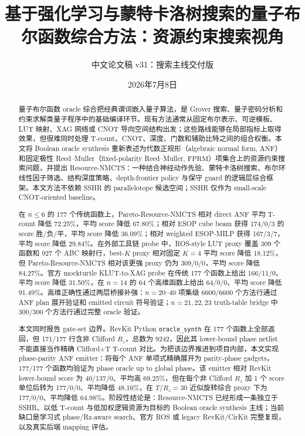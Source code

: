 \documentclass[UTF8,fontset=macnew,11pt]{ctexart}
\title{基于强化学习与蒙特卡洛树搜索的量子布尔函数综合方法：资源约束搜索视角}
\author{中文论文稿 v31：搜索主线交付版}
\date{2026年7月8日}
\newcommand{\method}{Resource-NMCTS}
\newcommand{\anf}{\ensuremath{\mathrm{ANF}}}
\newcommand{\fprm}{\ensuremath{\mathrm{FPRM}}}
\newcommand{\rz}{\ensuremath{R_z}}
\begin{document}
\pagestyle{plain}
\maketitle

\begin{abstract}
量子布尔函数 oracle 综合把经典谓词嵌入量子算法，是 Grover 搜索、量子密码分析和约束求解类量子程序中的基础编译环节。现有方法通常从固定布尔表示、可逆模板、LUT 映射、XAG 网络或 CNOT 导向空间结构出发；这些路线能够在局部指标上取得效果，但很难同时处理 T-count、CNOT、深度、门数和辅助比特之间的组合权衡。本文将 Boolean oracle synthesis 重新表述为代数正规形（algebraic normal form, \anf{}）和固定极性 Reed--Muller（fixed-polarity Reed--Muller, \fprm{}）项集合上的资源约束搜索问题，并提出 \method{}：一种结合神经动作先验、蒙特卡洛树搜索、布尔环线性因子筛选、结构深度策略、depth-frontier policy 与保守 guard 的逻辑层综合框架。本文方法不依赖 SSHR 的 parallelotope 候选空间；SSHR 仅作为 small-scale CNOT-oriented baseline。

在 $n\leq6$ 的 177 个传统函数上，Pareto-\method{} 相对 direct \anf{} 平均 T-count 降低 72.25\%，平均 score 降低 67.80\%；相对 ESOP cube beam 获得 174/0/3 的 score 胜/负/平，平均 score 降低 36.09\%；相对 weighted ESOP-MILP 获得 167/3/7，平均 score 降低 29.84\%。在外部工具链 probe 中，ROS-style LUT proxy 覆盖 309 个函数和 927 个 ABC 映射行，best-$K$ proxy 相对固定 $K=4$ 平均 score 降低 18.12\%，但 Pareto-\method{} 相对该更强 proxy 仍为 309/0/0，平均 score 降低 84.27\%。官方 mockturtle KLUT-to-XAG probe 在传统 177 个函数上给出 166/11/0、平均 score 降低 31.50\%，在 $n=14$ 的 64 个高维函数上给出 64/0/0、平均 score 降低 91.49\%。高维正确性通过两层桥接补强：$n=20$--$40$ 项集级 6600/6600 个方法行通过 \anf{} plan 展开验证和 emitted circuit 符号验证；$n=21,22,23$ truth-table bridge 中 300/300 个方法行通过完整 oracle 验证。

本文同时报告 gate-set 边界。RevKit Python \texttt{oracle\_synth} 在 177 个函数上全部返回，但 171/177 行含非 Clifford \rz{}，总数为 9242，因此其 lower-bound phase netlist 不能直接当作精确 Clifford+T T-count 对比。为把该边界推进到项目内部，本文实现 phase-parity \anf{} emitter：将每个 \anf{} 单项式精确展开为 parity-phase gadgets，177/177 个函数均验证为 phase oracle up to global phase。该 emitter 相对 RevKit lower-bound score 为 40/137/0、平均高 69.25\%，但在每个非 Clifford \rz{} 加 1 个 score 单位后转为 177/0/0、平均降低 48.16\%，在 $T/R_z=30$ 近似旋转综合 proxy 下为 177/0/0、平均降低 64.98\%。阶段性结论是：\method{} 已经形成一条独立于 SSHR、以低 T-count 与低加权逻辑资源为目标的 Boolean oracle synthesis 主线；当前缺口是学习式 phase/Rz-aware search、官方 ROS 或 legacy RevKit/CirKit 完整复现，以及真实后端 mapping 评估。
\end{abstract}
\end{document}
